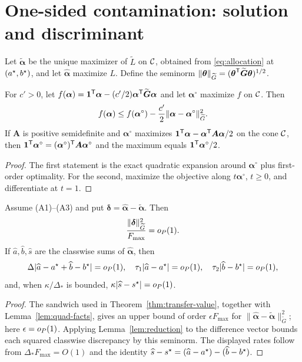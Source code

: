 \section{One-sided contamination: solution and discriminant}
Let $\widetilde{\boldsymbol\alpha}$ be the unique maximizer of $\widetilde L$ on $\mathcal{C}$, obtained from \eqref{eq:allocation} at $(a^{\star},b^{\star})$, and let $\widehat{\boldsymbol\alpha}$ maximize $L$. Define the seminorm
$\lVert\boldsymbol\theta\rVert_{\widetilde G}=(\boldsymbol\theta^{\mathsf{T}}\widetilde{\boldsymbol G}\boldsymbol\theta)^{1/2}$.

\begin{lemma}\label{lem:quad-facts}
For $c'>0$, let $f(\boldsymbol\alpha)=\mathbf{1}^{\mathsf{T}}\boldsymbol\alpha-(c'/2)\boldsymbol\alpha^{\mathsf{T}}\widetilde{\boldsymbol G}\boldsymbol\alpha$ and let $\boldsymbol\alpha^\circ$ maximize $f$ on $\mathcal{C}$. Then
\[
f(\boldsymbol\alpha)\le f(\boldsymbol\alpha^\circ)-{c'\over2}\lVert\boldsymbol\alpha-\boldsymbol\alpha^\circ\rVert_{\widetilde G}^2.
\]
If $\boldsymbol A$ is positive semidefinite and $\boldsymbol\alpha^\circ$ maximizes $\mathbf{1}^{\mathsf{T}}\boldsymbol\alpha-\boldsymbol\alpha^{\mathsf{T}}\boldsymbol A\boldsymbol\alpha/2$ on the cone $\mathcal{C}$, then
$\mathbf{1}^{\mathsf{T}}\boldsymbol\alpha^\circ=(\boldsymbol\alpha^\circ)^{\mathsf{T}}\boldsymbol A\boldsymbol\alpha^\circ$ and the maximum equals $\mathbf{1}^{\mathsf{T}}\boldsymbol\alpha^\circ/2$.
\end{lemma}
\begin{proof}
The first statement is the exact quadratic expansion around $\boldsymbol\alpha^\circ$ plus first-order optimality. For the second, maximize the objective along $t\boldsymbol\alpha^\circ$, $t\ge0$, and differentiate at $t=1$.
\end{proof}

\begin{theorem}\label{thm:dual-solution}
Assume (A1)--(A3) and put $\boldsymbol\delta=\widehat{\boldsymbol\alpha}-\widetilde{\boldsymbol\alpha}$. Then
\[
{\lVert\boldsymbol\delta\rVert_{\widetilde G}^2\over F_{\max}}=o_{P}(1).
\]
If $\widehat a,\widehat b,\widehat s$ are the classwise sums of $\widehat{\boldsymbol\alpha}$, then
\[
\Delta|\widehat a-a^{\star}+\widehat b-b^{\star}|=o_{P}(1),\quad
\tau_1|\widehat a-a^{\star}|=o_{P}(1),\quad
\tau_2|\widehat b-b^{\star}|=o_{P}(1),
\]
and, when $\kappa/\Delta_*$ is bounded, $\kappa|\widehat s-s^{\star}|=o_{P}(1)$.
\end{theorem}
\begin{proof}
The sandwich used in Theorem~\ref{thm:transfer-value}, together with Lemma~\ref{lem:quad-facts}, gives an upper bound of order $\epsilon F_{\max}$ for
$\lVert\widehat{\boldsymbol\alpha}-\widetilde{\boldsymbol\alpha}\rVert_{\widetilde G}^2$; here $\epsilon=o_{P}(1)$. Applying Lemma~\ref{lem:reduction} to the difference vector bounds each squared classwise discrepancy by this seminorm. The displayed rates follow from $\Delta_*F_{\max}=O(1)$ and the identity $\widehat s-s^{\star}=(\widehat a-a^{\star})-(\widehat b-b^{\star})$.
\end{proof}

